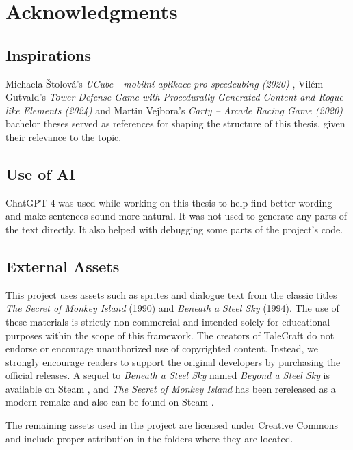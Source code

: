 \chapter{Acknowledgments}

\section{Inspirations}
Michaela Štolová's \textit{UCube - mobilní aplikace pro speedcubing (2020)} \cite{Stolova2020}, Vilém Gutvald's \textit{Tower Defense Game with Procedurally Generated Content and Rogue-like Elements (2024)} \cite{Gutvald2024} and Martin Vejbora's \textit{Carty – Arcade Racing Game (2020)} \cite{Vejbora2020}  bachelor theses served as references for shaping the structure of this thesis, given their relevance to the topic. 

\section{Use of AI}
ChatGPT-4 was used while working on this thesis to help find better wording and make sentences sound more natural. It was not used to generate any parts of the text directly. It also helped with debugging some parts of the project’s code. 

\section{External Assets}
This project uses assets such as sprites and dialogue text from the classic titles \textit{The Secret of Monkey Island} (1990) and \textit{Beneath a Steel Sky} (1994). The use of these materials is strictly non-commercial and intended solely for educational purposes within the scope of this framework. The creators of TaleCraft do not endorse or encourage unauthorized use of copyrighted content. Instead, we strongly encourage readers to support the original developers by purchasing the official releases. A sequel to \textit{Beneath a Steel Sky} named \textit{Beyond a Steel Sky} is available on Steam \cite{Beyond-a-Steel-Sky}, and \textit{The Secret of Monkey Island} has been rereleased as a modern remake and also can be found on Steam \cite{TSoMI-steam}. 

The remaining assets used in the project are licensed under Creative Commons and include proper attribution in the folders where they are located. 